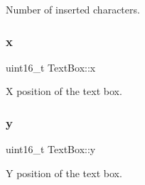 Number of inserted characters. 

\mbox{\label{group__textbox_ga61e7ab17d9106687e4cc5deb7b801c4f}} 
\subsubsection{\texorpdfstring{x}{x}}
{\footnotesize\ttfamily uint16\+\_\+t Text\+Box\+::x}



X position of the text box. 

\mbox{\label{group__textbox_ga7de1ea2ec650f3160a7fcbf21f5fe606}} 
\subsubsection{\texorpdfstring{y}{y}}
{\footnotesize\ttfamily uint16\+\_\+t Text\+Box\+::y}



Y position of the text box. 

